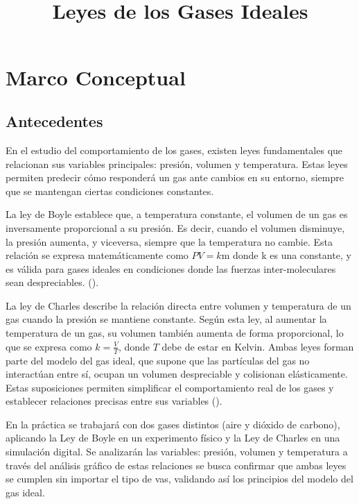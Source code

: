 \documentclass[12pt,a4paper]{config/myConfig}
\title{\Large $\ $\\ \bf Leyes de los Gases Ideales}
\author
\newcommand{\AssigmentNumber}{Practica 9}
\newcommand{\AssigmentDate}{28 Abril del 2025}
\begin{document}
\thispagestyle{myheadings}
\pagestyle{myheadings}
\markright{\tt \AssigmentNumber|    \AssigmentDate}%



\section{Marco Conceptual}
\label{sec:MARCO-CONCEPTUAL}

\subsection{Antecedentes}
\label{sec:ANTECEDENTES}

En el estudio del comportamiento de los gases, existen leyes fundamentales que relacionan sus variables principales: presión, volumen y temperatura. Estas leyes permiten predecir cómo responderá un gas ante cambios en su entorno, siempre que se mantengan ciertas condiciones constantes.  

La ley de Boyle establece que, a temperatura constante, el volumen de un gas es inversamente proporcional a su presión. Es decir, cuando el volumen disminuye, la presión aumenta, y viceversa, siempre que la temperatura no cambie. Esta relación se expresa matemáticamente como 
$PV = k$m donde k es una constante, y es válida para gases ideales en condiciones donde las fuerzas inter-moleculares sean despreciables. (\cite{physicsTextbook}). 

La ley de Charles describe la relación directa entre volumen y temperatura de un gas cuando la presión se mantiene constante. Según esta ley, al aumentar la temperatura de un gas, su volumen también aumenta de forma proporcional, lo que se expresa como 
$k = \frac{V}{T}$, donde $T$ debe de estar en Kelvin. Ambas leyes forman parte del modelo del gas ideal, que supone que las partículas del gas no interactúan entre sí, ocupan un volumen despreciable y colisionan elásticamente. Estas suposiciones permiten simplificar el comportamiento real de los gases y establecer relaciones precisas entre sus variables (\cite{physicsTextbook}). 

En la práctica se trabajará con dos gases distintos (aire y dióxido de carbono), aplicando la Ley de Boyle en un experimento físico y la Ley de Charles en una simulación digital. Se analizarán las variables: presión, volumen y temperatura a través del análisis gráfico de estas relaciones se busca confirmar que ambas leyes se cumplen sin importar el tipo de vas, validando así los principios del modelo del gas ideal.  
\end{document}
